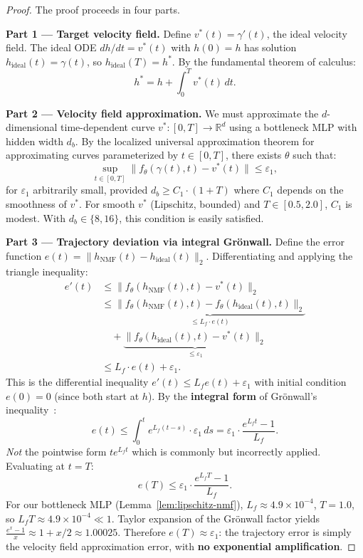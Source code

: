 \documentclass{scpe}
\newcommand{\RR}{\mathbb{R}}
\begin{document}
\begin{proof}
The proof proceeds in four parts.

\textbf{Part 1 --- Target velocity field.}
Define $v^*(t) = \gamma'(t)$, the ideal velocity field. The ideal ODE $dh/dt = v^*(t)$ with $h(0) = h$ has solution $h_{\text{ideal}}(t) = \gamma(t)$, so $h_{\text{ideal}}(T) = h^*$. By the fundamental theorem of calculus:
\begin{equation}
h^* = h + \int_0^T v^*(t)\,dt.
\end{equation}

\textbf{Part 2 --- Velocity field approximation.}
We must approximate the $d$-dimensional time-dependent curve $v^*: [0,T] \to \RR^d$ using a bottleneck MLP with hidden width $d_b$. By the localized universal approximation theorem for approximating curves parameterized by $t \in [0,T]$, there exists $\theta$ such that:
\begin{equation}
\sup_{t \in [0,T]} \|f_\theta(\gamma(t), t) - v^*(t)\| \leq \varepsilon_1,
\end{equation}
for $\varepsilon_1$ arbitrarily small, provided $d_b \geq C_1 \cdot (1+T)$ where $C_1$ depends on the smoothness of $v^*$. For smooth $v^*$ (Lipschitz, bounded) and $T \in [0.5, 2.0]$, $C_1$ is modest. With $d_b \in \{8, 16\}$, this condition is easily satisfied.

\textbf{Part 3 --- Trajectory deviation via integral Gr\"onwall.}
Define the error function $e(t) = \|h_{\text{NMF}}(t) - h_{\text{ideal}}(t)\|_2$. Differentiating and applying the triangle inequality:
\begin{align}
e'(t) &\leq \|f_\theta(h_{\text{NMF}}(t), t) - v^*(t)\|_2 \nonumber\\
&\leq \underbrace{\|f_\theta(h_{\text{NMF}}(t), t) - f_\theta(h_{\text{ideal}}(t), t)\|_2}_{\leq L_f \cdot e(t)} \nonumber\\
&\quad + \underbrace{\|f_\theta(h_{\text{ideal}}(t), t) - v^*(t)\|_2}_{\leq \varepsilon_1} \nonumber\\
&\leq L_f \cdot e(t) + \varepsilon_1.
\end{align}
This is the differential inequality $e'(t) \leq L_f e(t) + \varepsilon_1$ with initial condition $e(0) = 0$ (since both start at $h$). By the \textbf{integral form} of Gr\"onwall's inequality~\cite{hairer1993solving}:
\begin{equation}
e(t) \leq \int_0^t e^{L_f (t-s)} \cdot \varepsilon_1 \, ds = \varepsilon_1 \cdot \frac{e^{L_f t} - 1}{L_f}.
\end{equation}
\emph{Not} the pointwise form $t e^{L_f t}$ which is commonly but incorrectly applied. Evaluating at $t = T$:
\begin{equation}
e(T) \leq \varepsilon_1 \cdot \frac{e^{L_f T} - 1}{L_f}.
\end{equation}
For our bottleneck MLP (Lemma~\ref{lem:lipschitz-nmf}), $L_f \approx 4.9\times 10^{-4}$, $T=1.0$, so $L_f T \approx 4.9\times 10^{-4} \ll 1$. Taylor expansion of the Gr\"onwall factor yields $\frac{e^{x}-1}{x} \approx 1 + x/2 \approx 1.00025$. Therefore $e(T) \approx \varepsilon_1$: the trajectory error is simply the velocity field approximation error, with \textbf{no exponential amplification}.


\end{proof}
\end{document}

